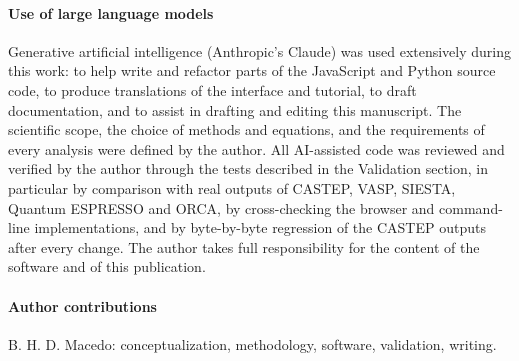\documentclass[11pt,a4paper]{article}
\begin{document}
\paragraph{Use of large language models} %
Generative artificial intelligence (Anthropic's Claude) was used extensively during this work: to help write and refactor parts of the JavaScript and Python source code, to produce translations of the interface and tutorial, to draft documentation, and to assist in drafting and editing this manuscript. The scientific scope, the choice of methods and equations, and the requirements of every analysis were defined by the author. All AI-assisted code was reviewed and verified by the author through the tests described in the Validation section, in particular by comparison with real outputs of CASTEP, VASP, SIESTA, Quantum ESPRESSO and ORCA, by cross-checking the browser and command-line implementations, and by byte-by-byte regression of the CASTEP outputs after every change. The author takes full responsibility for the content of the software and of this publication.

\paragraph{Author contributions} B. H. D. Macedo: conceptualization, methodology, software, validation, writing.
\appendix



\end{document}
